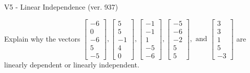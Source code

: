 \begin{exercise}
  \begin{exerciseTitle}V5 - Linear Independence (ver. 937)\end{exerciseTitle}
  \begin{exerciseStatement}
    Explain why the vectors \(\left[\begin{array}{r}
-6 \\
0 \\
-6 \\
5 \\
-5
\end{array}\right] , \left[\begin{array}{r}
5 \\
5 \\
-1 \\
4 \\
0
\end{array}\right] , \left[\begin{array}{r}
-1 \\
-1 \\
1 \\
-5 \\
-6
\end{array}\right] , \left[\begin{array}{r}
-5 \\
-6 \\
-2 \\
5 \\
5
\end{array}\right] , \text{ and } \left[\begin{array}{r}
3 \\
3 \\
1 \\
5 \\
-3
\end{array}\right]\) are linearly dependent or linearly independent.	



\end{exerciseStatement}
\end{exercise}
